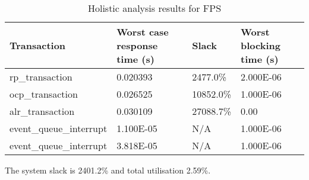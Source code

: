 \documentclass{article}
\begin{document}
\begin{table}[!htbp]
  \centering
  \begin{tabular}{llll}
    \toprule
    Transaction & Worst case response time (s) & Slack & Worst blocking time (s)  \\
    \midrule
    rp\_transaction & 0.020393  & 2477.0\% &  2.000E-06  \\
    ocp\_transaction & 0.026525 & 10852.0\% & 1.000E-06 \\
    alr\_transaction & 0.030109 & 27088.7\% & 0.00 \\
    event\_queue\_interrupt & 1.100E-05 & N/A & 1.000E-06 \\
    event\_queue\_interrupt & 3.818E-05 & N/A & 1.000E-06 \\
    \bottomrule
  \end{tabular}
  \caption{Holistic analysis results for FPS}
  \label{tab:holistic-fps}
\end{table}

The system slack is 2401.2\% and total utilisation 2.59\%.


\end{document}
